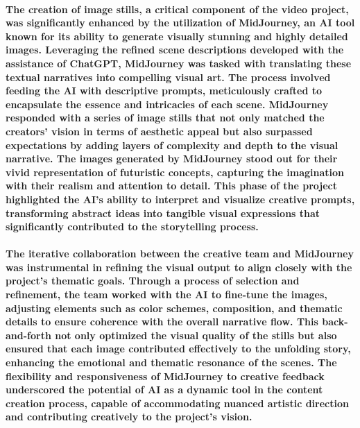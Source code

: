 \documentclass[11pt,a4paper,oneside]{report}
\begin{document}
\paragraph{The creation of image stills, a critical component of the video project, was significantly enhanced by the utilization of MidJourney, an AI tool known for its ability to generate visually stunning and highly detailed images. Leveraging the refined scene descriptions developed with the assistance of ChatGPT, MidJourney was tasked with translating these textual narratives into compelling visual art. The process involved feeding the AI with descriptive prompts, meticulously crafted to encapsulate the essence and intricacies of each scene. MidJourney responded with a series of image stills that not only matched the creators' vision in terms of aesthetic appeal but also surpassed expectations by adding layers of complexity and depth to the visual narrative. The images generated by MidJourney stood out for their vivid representation of futuristic concepts, capturing the imagination with their realism and attention to detail. This phase of the project highlighted the AI's ability to interpret and visualize creative prompts, transforming abstract ideas into tangible visual expressions that significantly contributed to the storytelling process.}

\paragraph{The iterative collaboration between the creative team and MidJourney was instrumental in refining the visual output to align closely with the project's thematic goals. Through a process of selection and refinement, the team worked with the AI to fine-tune the images, adjusting elements such as color schemes, composition, and thematic details to ensure coherence with the overall narrative flow. This back-and-forth not only optimized the visual quality of the stills but also ensured that each image contributed effectively to the unfolding story, enhancing the emotional and thematic resonance of the scenes. The flexibility and responsiveness of MidJourney to creative feedback underscored the potential of AI as a dynamic tool in the content creation process, capable of accommodating nuanced artistic direction and contributing creatively to the project's vision.}
\end{document}
